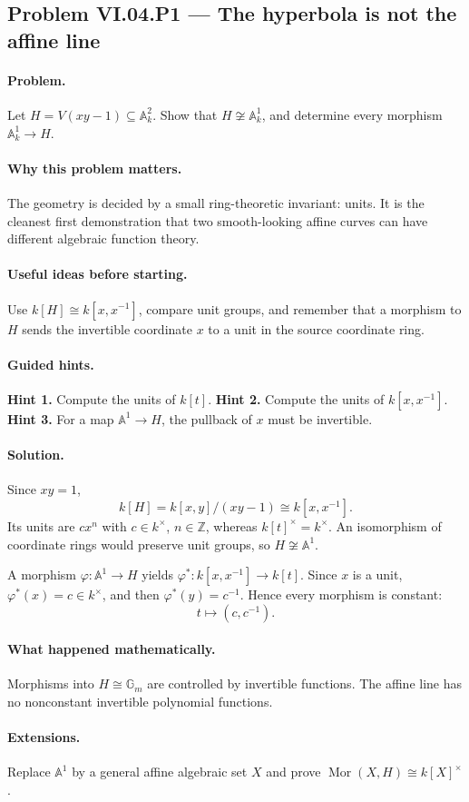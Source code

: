 \subsection*{Problem VI.04.P1 --- The hyperbola is not the affine line}
\label{prob:vi04-p1}
\paragraph{Problem.}
Let \(H=V(xy-1)\subseteq\mathbb A_k^2\).  Show that \(H\not\cong\mathbb A_k^1\), and
determine every morphism \(\mathbb A_k^1\to H\).
\ifdefined\FullProblemDossiers
\paragraph{Why this problem matters.}  The geometry is decided by a small ring-theoretic
invariant: units.  It is the cleanest first demonstration that two smooth-looking affine
curves can have different algebraic function theory.
\paragraph{Useful ideas before starting.}  Use \(k[H]\cong k[x,x^{-1}]\), compare unit
groups, and remember that a morphism to \(H\) sends the invertible coordinate \(x\) to a
unit in the source coordinate ring.
\paragraph{Guided hints.}
\textbf{Hint 1.} Compute the units of \(k[t]\).  \textbf{Hint 2.} Compute the units of
\(k[x,x^{-1}]\).  \textbf{Hint 3.} For a map \(\mathbb A^1\to H\), the pullback of \(x\)
must be invertible.
\paragraph{Solution.}
Since \(xy=1\),
\[
k[H]=k[x,y]/(xy-1)\cong k[x,x^{-1}].
\]
Its units are \(c x^n\) with \(c\in k^\times\), \(n\in\mathbb Z\), whereas
\(k[t]^\times=k^\times\).  An isomorphism of coordinate rings would preserve unit groups,
so \(H\not\cong\mathbb A^1\).

A morphism \(\varphi:\mathbb A^1\to H\) yields
\(\varphi^*:k[x,x^{-1}]\to k[t]\).  Since \(x\) is a unit, \(\varphi^*(x)=c\in k^\times\),
and then \(\varphi^*(y)=c^{-1}\).  Hence every morphism is constant:
\[
t\longmapsto(c,c^{-1}).
\]
\paragraph{What happened mathematically.}  Morphisms into \(H\cong\mathbb G_m\) are
controlled by invertible functions.  The affine line has no nonconstant invertible
polynomial functions.
\paragraph{Extensions.}  Replace \(\mathbb A^1\) by a general affine algebraic set \(X\)
and prove \(\operatorname{Mor}(X,H)\cong k[X]^\times\).
\fi
